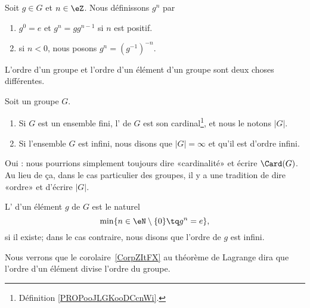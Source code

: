 \begin{definition}
	Soit \( g\in G\) et \( n\in \eZ\). Nous définissons \( g^n\) par
	\begin{enumerate}
		\item
		      \( g^0=e\) et \( g^n=gg^{n-1}\) si \( n\) est positif.
		\item
		      si \( n<0\), nous posons \( g^n=(g^{-1})^{-n}\).
	\end{enumerate}
\end{definition}

L'ordre d'un groupe et l'ordre d'un élément d'un groupe sont deux choses différentes.

\begin{definition}    \label{DEFooKWBCooMlmpCP}
	Soit un groupe \( G\).
	\begin{enumerate}
		\item
		      Si \( G\) est un ensemble fini, l' de \( G\) est son cardinal\footnote{Définition \ref{PROPooJLGKooDCcnWi}.}, et nous le notons \( | G |\).
		\item
		      Si l'ensemble \( G\) est infini, nous disons que \( | G |=\infty\) et qu'il est d'ordre infini.
	\end{enumerate}
	Oui : nous pourrions simplement toujours dire «cardinalité» et écrire \( \Card(G)\). Au lieu de ça, dans le cas particulier des groupes, il y a une tradition de dire «ordre» et d'écrire \( | G |\).
\end{definition}

\begin{definition}      \label{DEFooKSTVooOObpgC}
	L' d'un élément \( g\) de \( G\) est le naturel
	\begin{equation}
		\min\{ n\in\eN\setminus\{ 0 \}\tq g^n=e \},
	\end{equation}
	si il existe; dans le cas contraire, nous disons que l'ordre de \( g\) est infini.
\end{definition}

\begin{normaltext}
	Nous verrons que le corolaire~\ref{CorpZItFX} au théorème de Lagrange dira que l'ordre d'un élément divise l'ordre du groupe.
\end{normaltext}

